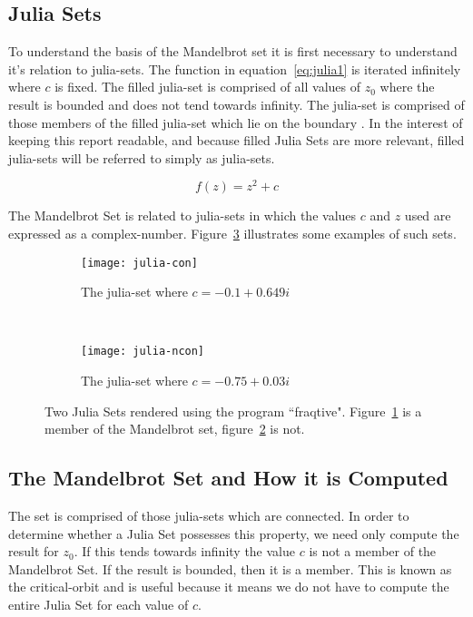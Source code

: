 \subsection*{Julia Sets}

To understand the basis of the Mandelbrot set it is first necessary to understand it's relation to julia-sets.
The function in equation~\ref{eq:julia1} is iterated infinitely where \(c\) is fixed.
The filled julia-set is comprised of all values of \(z_0\) where the result is bounded and does not tend towards infinity.
The julia-set is comprised of those members of the filled julia-set which lie on the boundary \cite{chaosfract}.
In the interest of keeping this report readable, and because filled Julia Sets are more relevant, filled julia-sets will be 
referred to simply as julia-sets.

\begin{equation}\label{eq:julia1}
f(z) = z^2 + c
\end{equation}

The Mandelbrot Set is related to julia-sets in which the values \(c\) and \(z\) used are expressed as a 
complex-number. Figure~\ref{fig:juliaimgs} illustrates some examples of such sets. 

\begin{figure}[h]
\centering
\begin{subfigure}[b]{0.48\textwidth}
  \centering    
  \texttt{[image: julia-con]}
  \caption{
    \tiny The julia-set where \(c = -0.1 + 0.649i\)
  }
  \label{fig:juliaimgcon}
\end{subfigure}
~ %
\begin{subfigure}[b]{0.48\textwidth}
  \centering
  \texttt{[image: julia-ncon]}
  \caption{
    \tiny The julia-set where \(c = -0.75 + 0.03i\)
  }
  \label{fig:juliaimgncon}
\end{subfigure}
\caption{
  Two Julia Sets rendered using the program ``fraqtive"\cite{fraqtive}. 
  Figure~\ref{fig:juliaimgcon} is a member of the Mandelbrot set, 
  figure~\ref{fig:juliaimgncon} is not.
}
\label{fig:juliaimgs}
\end{figure}

\subsection*{The Mandelbrot Set and How it is Computed}

The set is comprised of those julia-sets which are connected. In order to determine whether a Julia Set possesses this property,
we need only compute the result for \(z_0\). If this tends towards infinity the value \(c\) is not a member of the Mandelbrot Set. If the result
is bounded, then it is a member. This is known as the \gls{critical-orbit} and is useful because it means we do not have to compute
the entire Julia Set for each value of \(c\).

